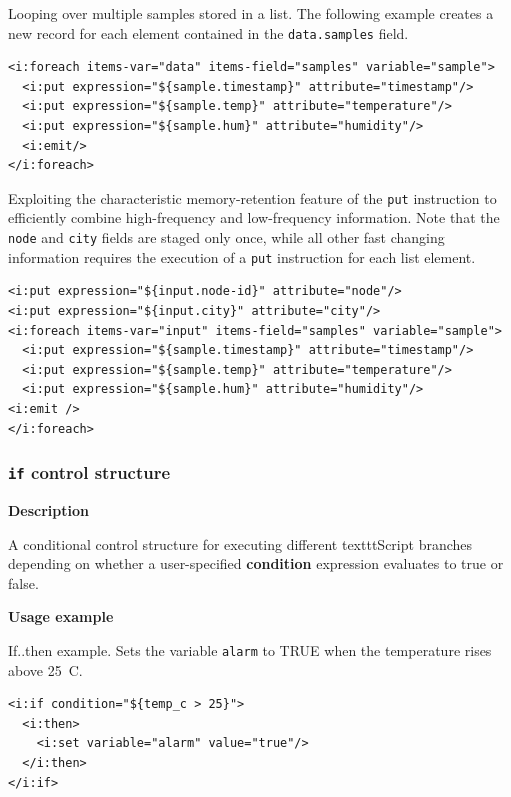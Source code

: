 Looping over multiple samples stored in a list. The following example creates a
new record for each element contained in the \texttt{data.samples} field. 

\lstset{language=XML}
\begin{lstlisting}
<i:foreach items-var="data" items-field="samples" variable="sample">
  <i:put expression="${sample.timestamp}" attribute="timestamp"/>
  <i:put expression="${sample.temp}" attribute="temperature"/>
  <i:put expression="${sample.hum}" attribute="humidity"/>
  <i:emit/>
</i:foreach>
\end{lstlisting}

Exploiting the characteristic memory-retention feature of the \texttt{put}
instruction to efficiently combine high-frequency and low-frequency
information. Note that the \texttt{node} and \texttt{city} fields are staged
only once, while all other fast changing information requires the execution of
a \texttt{put} instruction for each list element.

\lstset{language=XML}
\begin{lstlisting}
<i:put expression="${input.node-id}" attribute="node"/>
<i:put expression="${input.city}" attribute="city"/>
<i:foreach items-var="input" items-field="samples" variable="sample">
  <i:put expression="${sample.timestamp}" attribute="timestamp"/>
  <i:put expression="${sample.temp}" attribute="temperature"/>
  <i:put expression="${sample.hum}" attribute="humidity"/>
<i:emit />
</i:foreach> 
\end{lstlisting}

\subsubsection{\texttt{if} control structure}

\textbf{Description}

A conditional control structure for executing different texttt{Script} branches
depending on whether a user-specified \textbf{condition} expression evaluates
to true or false.

\textbf{Usage example}

If..then example. Sets the variable \texttt{alarm} to TRUE when the temperature
rises above 25\degree~C.

\lstset{language=XML}
\begin{lstlisting}
<i:if condition="${temp_c > 25}"> 
  <i:then>
    <i:set variable="alarm" value="true"/>
  </i:then>
</i:if>
\end{lstlisting}

